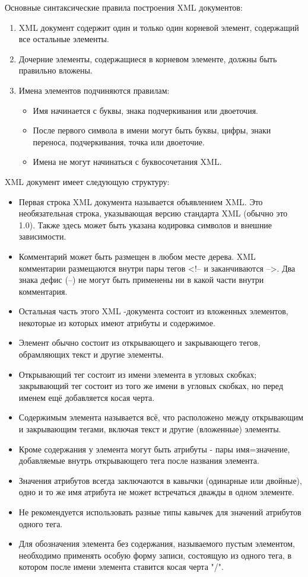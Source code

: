 \documentclass[12pt,a4paper,oneside]{article} %
\begin{document}
Основные синтаксические правила построения XML документов:

\begin{enumerate}
\item XML документ содержит один и только один корневой элемент, содержащий все остальные элементы.

\item Дочерние элементы, содержащиеся в корневом элементе, должны быть правильно вложены.

\item Имена элементов подчиняются правилам:
\begin{itemize}
\item Имя начинается с буквы, знака подчеркивания или двоеточия.
\item	После первого символа в имени могут быть буквы, цифры, знаки переноса, подчеркивания, точка или двоеточие.
\item	Имена не могут начинаться с буквосочетания XML.
\end{itemize}
\end{enumerate}

XML документ имеет следующую структуру:

\begin{itemize}
\item Первая строка XML документа называется объявлением XML. Это необязательная строка, указывающая версию стандарта XML (обычно это 1.0). Также здесь может быть указана кодировка символов и внешние зависимости.
\item	Комментарий может быть размещен в любом месте дерева. XML комментарии размещаются внутри пары тегов <!-- и заканчиваются -->. Два знака дефис (--) не могут быть применены ни в какой части внутри комментария.
\item	Остальная часть этого XML -документа состоит из вложенных элементов, некоторые из которых имеют атрибуты и содержимое.
\item	Элемент обычно состоит из открывающего и закрывающего тегов, обрамляющих текст и другие элементы.
\item	Открывающий тег состоит из имени элемента в угловых скобках; закрывающий тег состоит из того же имени в угловых скобках, но перед именем ещё добавляется косая черта.
\item Содержимым элемента называется всё, что расположено между открывающим и закрывающим тегами, включая текст и другие (вложенные) элементы.
\item	Кроме содержания у элемента могут быть атрибуты - пары имя=значение, добавляемые внутрь открывающего тега после названия элемента.
\item	Значения атрибутов всегда заключаются в кавычки (одинарные или двойные), одно и то же имя атрибута не может встречаться дважды в одном элементе.
\item	Не рекомендуется использовать разные типы кавычек для значений атрибутов одного тега.
\item	Для обозначения элемента без содержания, называемого пустым элементом, необходимо применять особую форму записи, состоящую из одного тега, в котором после имени элемента ставится косая черта "/".
\end{itemize}
\end{document}
